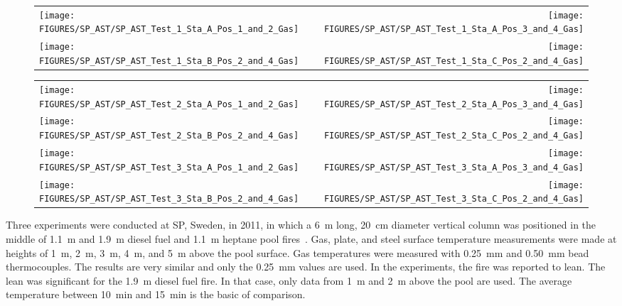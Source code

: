 \begin{figure}[h!]
\begin{tabular*}{\textwidth}{l@{\extracolsep{\fill}}r}
\texttt{[image: FIGURES/SP\_AST/SP\_AST\_Test\_1\_Sta\_A\_Pos\_1\_and\_2\_Gas]} &
\texttt{[image: FIGURES/SP\_AST/SP\_AST\_Test\_1\_Sta\_A\_Pos\_3\_and\_4\_Gas]} \\
\texttt{[image: FIGURES/SP\_AST/SP\_AST\_Test\_1\_Sta\_B\_Pos\_2\_and\_4\_Gas]} &
\texttt{[image: FIGURES/SP\_AST/SP\_AST\_Test\_1\_Sta\_C\_Pos\_2\_and\_4\_Gas]}
\end{tabular*}
\label{SP_Test_1_Gas}
\end{figure}

\newpage

\begin{figure}[p]
\begin{tabular*}{\textwidth}{l@{\extracolsep{\fill}}r}
\texttt{[image: FIGURES/SP\_AST/SP\_AST\_Test\_2\_Sta\_A\_Pos\_1\_and\_2\_Gas]} &
\texttt{[image: FIGURES/SP\_AST/SP\_AST\_Test\_2\_Sta\_A\_Pos\_3\_and\_4\_Gas]} \\
\texttt{[image: FIGURES/SP\_AST/SP\_AST\_Test\_2\_Sta\_B\_Pos\_2\_and\_4\_Gas]} &
\texttt{[image: FIGURES/SP\_AST/SP\_AST\_Test\_2\_Sta\_C\_Pos\_2\_and\_4\_Gas]} \\
\texttt{[image: FIGURES/SP\_AST/SP\_AST\_Test\_3\_Sta\_A\_Pos\_1\_and\_2\_Gas]} &
\texttt{[image: FIGURES/SP\_AST/SP\_AST\_Test\_3\_Sta\_A\_Pos\_3\_and\_4\_Gas]} \\
\texttt{[image: FIGURES/SP\_AST/SP\_AST\_Test\_3\_Sta\_B\_Pos\_2\_and\_4\_Gas]} &
\texttt{[image: FIGURES/SP\_AST/SP\_AST\_Test\_3\_Sta\_C\_Pos\_2\_and\_4\_Gas]}
\end{tabular*}
\label{SP_Test_2_3_Gas}
\end{figure}

\clearpage

Three experiments were conducted at SP, Sweden, in 2011, in which a 6~m long, 20~cm diameter vertical column was positioned in the middle of 1.1~m and 1.9~m diesel fuel and 1.1~m heptane pool fires~\cite{Sjostrom:AST}. Gas, plate, and steel surface temperature measurements were made at heights of 1~m, 2~m, 3~m, 4~m, and 5~m above the pool surface. Gas temperatures were measured with 0.25~mm and 0.50~mm bead thermocouples. The results are very similar and only the 0.25~mm values are used. In the experiments, the fire was reported to lean. The lean was significant for the 1.9~m diesel fuel fire. In that case, only data from 1~m and 2~m above the pool are used. The average temperature between 10~min and 15~min is the basic of comparison.

